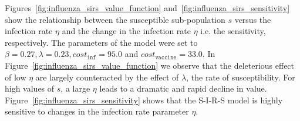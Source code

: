 
Figures~\ref{fig:influenza_sirs_value_function} and~\ref{fig:influenza_sirs_sensitivity} show the relationship between the susceptible sub-population {\footnotesize $s$} versus the infection rate {\footnotesize $\eta$} and the change in the infection rate {\footnotesize $\eta$} i.e. the sensitivity, respectively. The parameters of the model were set to {\footnotesize$ \beta = 0.27, \lambda = 0.23, cost_{\mathtt{inf}} = 95.0$} and {\footnotesize$cost_{\mathtt{vaccine}} = 33.0$}. In Figure~\ref{fig:influenza_sirs_value_function} we observe that the deleterious effect of low {\footnotesize $\eta$} are largely counteracted by the effect of {\footnotesize $ \lambda $}, the rate of susceptibility. For high values of {\footnotesize $s$}, a large {\footnotesize $\eta$} leads to a dramatic and rapid decline in value. Figure~\ref{fig:influenza_sirs_sensitivity} shows that the S-I-R-S model is highly sensitive to changes in the infection rate parameter {\footnotesize $\eta$}.
